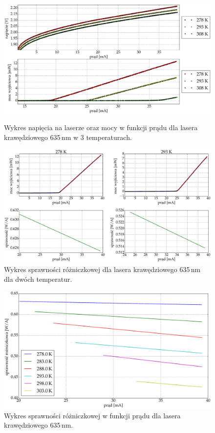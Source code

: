 \begin{figure}
\center
  \includegraphics[scale=0.30]{plot635/plot_voltage_power.eps}
  \label{fig:plot_voltage_power}
  \caption{Wykres napięcia na laserze oraz mocy w funkcji prądu dla lasera krawędziowego 635\,nm w 3 temperaturach.}
\end{figure}
\begin{figure}
\center
  \includegraphics[scale=0.30]{plot635/plot_eff_via_current4.eps}
  \caption{Wykres sprawności różniczkowej dla lasera krawędziowego 635\,nm dla dwóch temperatur.}
  \label{fig:plot_eff_via_current4}
\end{figure}
\begin{figure}
\center
  \includegraphics[scale=0.30]{plot635/plot_eff_via_current_all.eps}
  \caption{Wykres sprawności różniczkowej w funkcji prądu dla lasera krawędziowego 635\,nm.}
  \label{fig:plot_eff_via_current_all}
\end{figure}
\newpage
